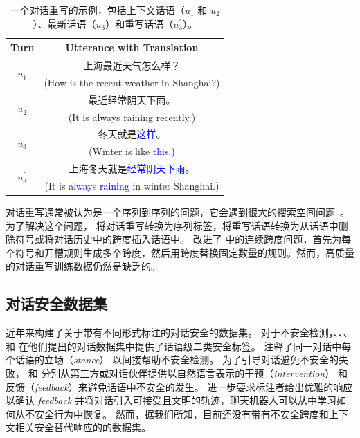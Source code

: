             
\newcommand{\zptu}[1]{\textcolor{zptu}{(zptu: #1)}}
\begin{table} \small
    \centering
    \caption{一个对话重写的示例，包括上下文话语（$u_1$ 和 $u_2$）、最新话语（$u_3$）和重写话语（$u_3^\prime$）。}
    \label{tab:example}
    \begin{tabular}{cc}
    \toprule
    Turn & Utterance with Translation \\
    \midrule
    \multirow{2}{*}{$u_1$} & 上海最近天气怎么样？\\
         & (How is the recent weather in Shanghai?) \\
    \midrule
    \multirow{2}{*}{$u_2$} & 最近经常阴天下雨。\\
         & (It is always raining recently.) \\
    \midrule
    \multirow{2}{*}{$u_3$} & 冬天就是\textcolor{blue}{这样}。\\
         & (Winter is like \textcolor{blue}{this}.) \\
    \midrule
    \multirow{2}{*}{$u_3^\prime$} & \textcolor{zptu}{上海}冬天就是\textcolor{blue}{经常阴天下雨}。\\
         & (It is \textcolor{blue}{always raining} in winter \textcolor{zptu}{Shanghai}.) \\
    \bottomrule
    \end{tabular}
    \vspace{-1.2em}
\end{table}

对话重写通常被认为是一个序列到序列的问题，它会遇到很大的搜索空间问题~\cite{elgohary2019can,huang2021sarg}。为了解决这个问题，\citet{hao2021rast} 将对话重写转换为序列标签，将重写话语转换为从话语中删除符号或将对话历史中的跨度插入话语中。 \citet{jin2022hierarchical} 改进了 \cite{hao2021rast} 中的连续跨度问题，首先为每个符号和开槽规则生成多个跨度，然后用跨度替换固定数量的规则。然而，高质量的对话重写训练数据仍然是缺乏的。

\subsection{对话安全数据集} 近年来构建了关于带有不同形式标注的对话安全的数据集。 对于不安全检测，\citet{qian2019benchmark}、\citet{xu2020recipes}、\citet{baheti2021just}、\citet{ung2021saferdialogues} 和 \citet{sun2021safety} 在他们提出的对话数据集中提供了话语级二类安全标签。 \citet{baheti2021just} 注释了同一对话中每个话语的立场（\textit{stance}） 以间接帮助不安全检测。 为了引导对话避免不安全的失败，\citet{qian2019benchmark} 和 \citet{ung2021saferdialogues} 分别从第三方或对话伙伴提供以自然语言表示的干预（\textit{intervention}） 和 反馈（\textit{feedback}）来避免话语中不安全的发生。 \citet{ung2021saferdialogues} 进一步要求标注者给出优雅的响应以确认 \textit{feedback} 并将对话引入可接受且文明的轨迹，聊天机器人可以从中学习如何从不安全行为中恢复。 然而，据我们所知，目前还没有带有不安全跨度和上下文相关安全替代响应的的数据集。

